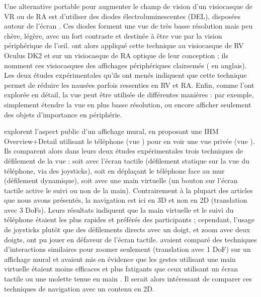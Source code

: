 Une alternative portable pour augmenter le champ de vision d'un visiocasque de VR ou de RA est d'utiliser des diodes électroluminescentes (DEL), disposées autour de l'écran . Ces diodes forment une vue  de très basse résolution mais peu chère, légère, avec un fort contraste et destinée à être vue par la vision périphérique de l'\oe il. \cite{Xiao2016} ont alors appliqué cette technique au visiocasque de RV Oculus DK2 et sur un visiocasque de RA optique de leur conception ; ils nomment ces visiocasques des affichages périphériques clairsemés ( en anglais). Les deux études expérimentales qu'ils ont menés indiquent que cette technique permet de réduire les nausées parfois ressenties en RV et RA. Enfin, comme \cite{Jones2013} l'ont explorée en détail, la vue  peut être utilisée de différentes manières : par exemple, simplement étendre la vue  en plus basse résolution, ou encore afficher seulement des objets d'importance en périphérie.



\cite{Berge2014} explorent l'aspect public d'un affichage mural, en proposant une IHM Overview+Detail utilisant le téléphone (vue ) pour en voir une vue privée (vue ). Ils comparent alors dans leurs deux études expérimentales trois techniques de défilement de la vue   : soit avec l'écran tactile (défilement statique sur la vue du téléphone, via des joysticks), soit en déplaçant le téléphone face au mur (défilement dynamique), soit avec une main virtuelle (un bouton sur l'écran tactile active le suivi ou non de la main). Contrairement à la plupart des articles que nous avons présentés, la navigation est ici en 3D et non en 2D (translation avec 3 DoFs). Leurs résultats indiquent que la main virtuelle et le suivi du téléphone étaient les plus rapides et préférés des participants ; cependant, l'usage de joysticks plutôt que des défilements directs avec un doigt, et zoom avec deux doigts, ont pu jouer en défaveur de l'écran tactile. \cite{Nancel2011} avaient comparé des techniques d'interactions similaires pour zoomer seulement (translation avec 1 DoF) sur un affichage mural et avaient mis en évidence que les gestes utilisant une main virtuelle étaient moins efficaces et plus fatigants que ceux utilisant un écran tactile ou une molette tenue en main . Il serait alors intéressant de comparer ces techniques de navigation avec un contenu en 2D.


